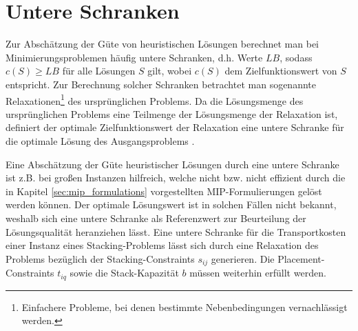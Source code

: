 








\section{Untere Schranken}
\label{sec:lower_bounds}

Zur Abschätzung der Güte von heuristischen Lösungen berechnet man bei Minimierungsproblemen häufig untere Schranken,
d.h. Werte $LB$, sodass $c(S) \geq LB$ für alle Lösungen $S$ gilt, wobei $c(S)$ dem Zielfunktionswert von $S$ entspricht.
Zur Berechnung solcher Schranken betrachtet man sogenannte Relaxationen\footnote{Einfachere Probleme, bei denen bestimmte Nebenbedingungen vernachlässigt werden.} des ursprünglichen Problems.
Da die Lösungsmenge des ursprünglichen Problems eine Teilmenge der Lösungsmenge der Relaxation ist,
definiert der optimale Zielfunktionswert der Relaxation eine untere Schranke für die optimale Lösung des Ausgangsproblems
\cite{Knust2017}.

Eine Abschätzung der Güte heuristischer Lösungen durch eine untere Schranke ist z.B. bei großen Instanzen hilfreich,
welche nicht bzw. nicht effizient durch die in Kapitel \ref{sec:mip_formulations} vorgestellten MIP-Formulierungen gelöst werden können.
Der optimale Lösungswert ist in solchen Fällen nicht bekannt, weshalb sich eine untere Schranke als Referenzwert
zur Beurteilung der Lösungsqualität heranziehen lässt. Eine untere Schranke für die Transportkosten einer Instanz eines Stacking-Problems lässt sich durch eine Relaxation des Problems bezüglich der Stacking-Constraints $s_{ij}$ generieren.
Die Placement-Constraints $t_{iq}$ sowie die Stack-Kapazität $b$ müssen weiterhin erfüllt werden.

